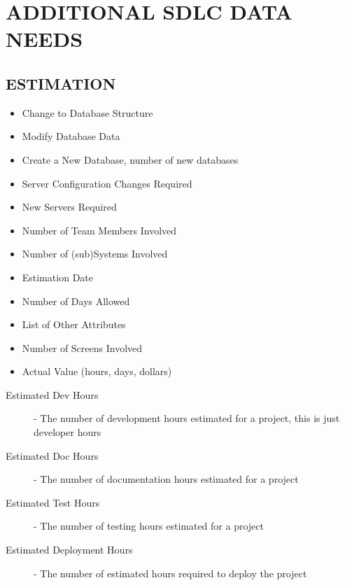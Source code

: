 \documentclass[SDSUThesis.tex]{subfiles}
\begin{document}
        
    


\section{ADDITIONAL SDLC DATA NEEDS}

    \subsection{ESTIMATION}
    
    \begin{itemize}
    \item Change to Database Structure  
    \item Modify Database Data    
    \item Create a New Database, number of new databases  
    \item Server Configuration Changes Required   
    \item New Servers Required   
    \item Number of Team Members Involved  
    \item Number of (sub)Systems Involved  
    \item Estimation Date
    \item Number of Days Allowed
    \item List of Other Attributes
    \item Number of Screens Involved 
    \item Actual Value (hours, days, dollars) 
    \end{itemize}
    
    
    \begin{description}
        \item[Estimated Dev Hours] - 
            The number of development hours estimated for a 
            project, this is just developer hours
        \item[Estimated Doc Hours] - 
            The number of documentation hours estimated for a project
        \item[Estimated Test Hours] - 
            The number of testing hours estimated for a project
        \item[Estimated Deployment Hours] - 
            The number of estimated hours required to 
            deploy the project
    \end{description}
    
\end{document}
